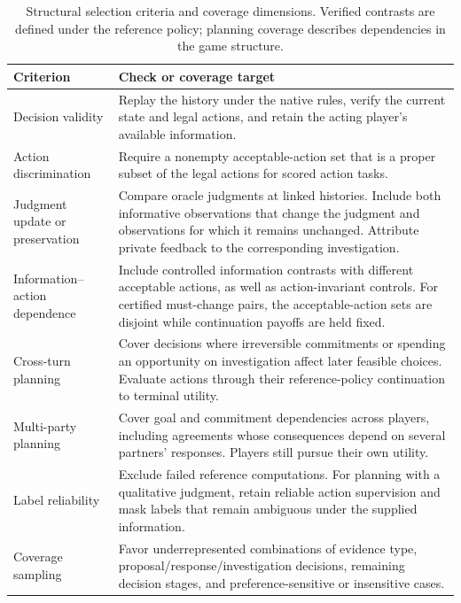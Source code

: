 \begin{table}[htbp]
\centering\small
\renewcommand{\arraystretch}{1.15}
\setlength{\tabcolsep}{5pt}
\caption{Structural selection criteria and coverage dimensions. Verified
contrasts are defined under the reference policy; planning coverage describes
dependencies in the game structure.}
\label{tab:slice-selection}
\begin{tabular}{@{}p{}p{}@{}}
\hline
Criterion & Check or coverage target \\
\hline

Decision validity & Replay the history under the native rules, verify the
current state and legal actions, and retain the acting player's available
information. \\
Action discrimination & Require a nonempty acceptable-action set that is a
proper subset of the legal actions for scored action tasks. \\
Judgment update or preservation & Compare oracle judgments at linked
histories. Include both informative observations that change the judgment
and observations for which it remains unchanged. Attribute private feedback
to the corresponding investigation. \\
Information--action dependence & Include controlled information contrasts
with different acceptable actions, as well as action-invariant controls.
For certified must-change pairs, the acceptable-action sets are disjoint
while continuation payoffs are held fixed. \\
Cross-turn planning & Cover decisions where irreversible commitments or
spending an opportunity on investigation affect later feasible choices.
Evaluate actions through their reference-policy continuation to terminal
utility. \\
Multi-party planning & Cover goal and commitment dependencies across
players, including agreements whose consequences depend on several
partners' responses. Players still pursue their own utility. \\
Label reliability & Exclude failed reference computations. For planning
with a qualitative judgment, retain reliable action supervision and mask
labels that remain ambiguous under the supplied information. \\
Coverage sampling & Favor underrepresented combinations of evidence type,
proposal/response/investigation decisions, remaining decision stages, and
preference-sensitive or insensitive cases. \\
\hline
\end{tabular}
\end{table}

